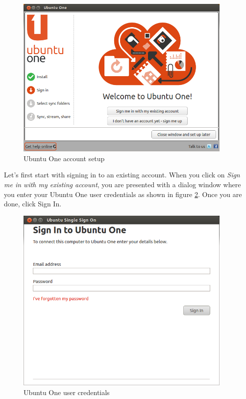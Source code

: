 \begin{figure}[h!]	
	\centering
	\includegraphics[width=300pt]{./images/basic-tasks/share3.png}
	\caption{Ubuntu One account setup}	
	\label{fig:share3}		
\end{figure}

\par \noindent Let's first start with signing in to an existing account. When you click on \textit{Sign me in with my existing account}, you are presented with a dialog window where you enter your Ubuntu One user credentials as shown in figure \ref{fig:share4}. Once you are done, click Sign In. \\

\begin{figure}[h!]	
	\centering
	\includegraphics[width=300pt]{./images/basic-tasks/share4.png}
	\caption{Ubuntu One user credentials}	
	\label{fig:share4}		
\end{figure}

